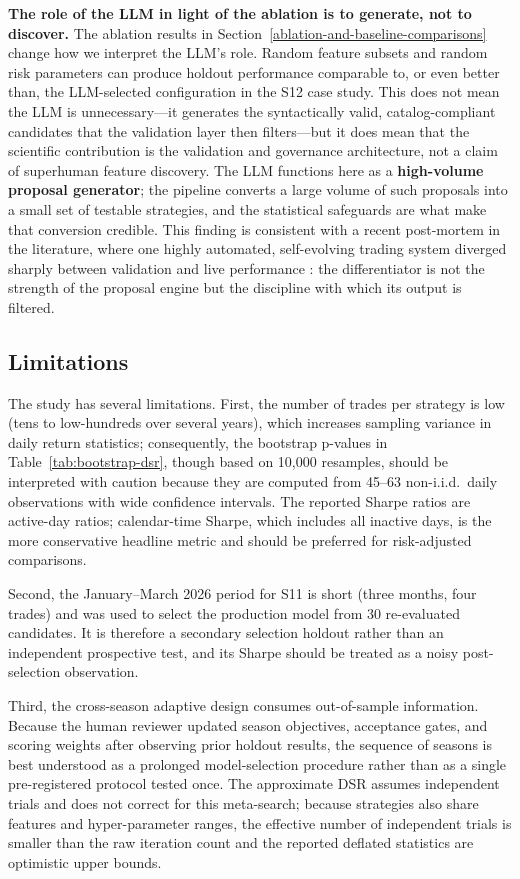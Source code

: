 \documentclass[11pt,a4paper]{article}
\begin{document}
\textbf{The role of the LLM in light of the ablation is to generate, not to discover.} The ablation results in Section~\ref{ablation-and-baseline-comparisons} change how we interpret the LLM's role. Random feature subsets and random risk parameters can produce holdout performance comparable to, or even better than, the LLM-selected configuration in the S12 case study. This does not mean the LLM is unnecessary---it generates the syntactically valid, catalog-compliant candidates that the validation layer then filters---but it does mean that the scientific contribution is the validation and governance architecture, not a claim of superhuman feature discovery. The LLM functions here as a \textbf{high-volume proposal generator}; the pipeline converts a large volume of such proposals into a small set of testable strategies, and the statistical safeguards are what make that conversion credible. This finding is consistent with a recent post-mortem in the literature, where one highly automated, self-evolving trading system diverged sharply between validation and live performance \citep{chen_2025_redqueen}: the differentiator is not the strength of the proposal engine but the discipline with which its output is filtered.

\subsection{Limitations}\label{limitations}

The study has several limitations. First, the number of trades per strategy is low (tens to low-hundreds over several years), which increases sampling variance in daily return statistics; consequently, the bootstrap p-values in Table~\ref{tab:bootstrap-dsr}, though based on 10,000 resamples, should be interpreted with caution because they are computed from 45--63 non-i.i.d.~daily observations with wide confidence intervals. The reported Sharpe ratios are active-day ratios; calendar-time Sharpe, which includes all inactive days, is the more conservative headline metric and should be preferred for risk-adjusted comparisons.

Second, the January--March 2026 period for S11 is short (three months, four trades) and was used to select the production model from 30 re-evaluated candidates. It is therefore a secondary selection holdout rather than an independent prospective test, and its Sharpe should be treated as a noisy post-selection observation.

Third, the cross-season adaptive design consumes out-of-sample information. Because the human reviewer updated season objectives, acceptance gates, and scoring weights after observing prior holdout results, the sequence of seasons is best understood as a prolonged model-selection procedure rather than as a single pre-registered protocol tested once. The approximate DSR assumes independent trials and does not correct for this meta-search; because strategies also share features and hyper-parameter ranges, the effective number of independent trials is smaller than the raw iteration count and the reported deflated statistics are optimistic upper bounds.
\end{document}
